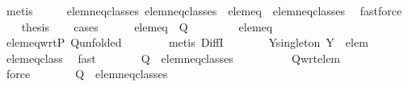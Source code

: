 \begin{isabellebody}
\ metis\isanewline
\ \ \isamarkupfalse%
\ \isamarkupfalse%
\ elem{\isacharunderscore}neq{\isacharunderscore}classes{\isacharcolon}\ {\isachardoublequoteopen}{\isacharquery}elem{\isacharunderscore}neq{\isacharunderscore}classes\ {\isacharminus}\ {\isacharbraceleft}{\isacharquery}elem{\isacharunderscore}eq{\isacharbraceright}\ {\isacharequal}\ {\isacharquery}elem{\isacharunderscore}neq{\isacharunderscore}classes{\isachardoublequoteclose}\ \isamarkupfalse%
\ fastforce\isanewline
\isanewline
\ \ \isamarkupfalse%
\ {\isacharquery}thesis\isanewline
\ \ \isamarkupfalse%
\ cases\isanewline
\ \ \ \ \isamarkupfalse%
\ {\isachardoublequoteopen}{\isacharquery}elem{\isacharunderscore}eq\ {\isasymnotin}\ {\isacharquery}Q{\isachardoublequoteclose}\ \isanewline
\ \ \ \ \isamarkupfalse%
\ \isamarkupfalse%
\ {\isachardoublequoteopen}{\isacharquery}elem{\isacharunderscore}eq\ {\isasymin}\ {\isacharbraceleft}{\isacharbraceleft}{\isacharbraceright}{\isacharbraceright}{\isachardoublequoteclose}\isanewline
\ \ \ \ \ \ \isamarkupfalse%
\ elem{\isacharunderscore}eq{\isacharunderscore}wrt{\isacharunderscore}P\ Q{\isacharunderscore}unfolded\isanewline
\ \ \ \ \ \ \isamarkupfalse%
\ {\isacharparenleft}metis\ DiffI{\isacharparenright}\isanewline
\ \ \ \ \isamarkupfalse%
\ \isamarkupfalse%
\ Y{\isacharunderscore}singleton{\isacharcolon}\ {\isachardoublequoteopen}Y\ {\isacharequal}\ {\isacharbraceleft}elem{\isacharbraceright}{\isachardoublequoteclose}\ \isamarkupfalse%
\ elem{\isacharunderscore}eq{\isacharunderscore}class\ \isamarkupfalse%
\ fast\isanewline
\ \ \ \ \isamarkupfalse%
\ \isamarkupfalse%
\ {\isachardoublequoteopen}{\isacharquery}Q\ {\isacharequal}\ {\isacharquery}elem{\isacharunderscore}neq{\isacharunderscore}classes\ {\isacharminus}\ {\isacharbraceleft}{\isacharbraceleft}{\isacharbraceright}{\isacharbraceright}{\isachardoublequoteclose}\isanewline
\ \ \ \ \ \ \isamarkupfalse%
\ Q{\isacharunderscore}wrt{\isacharunderscore}elem\isanewline
\ \ \ \ \ \ \isamarkupfalse%
\ force\isanewline
\ \ \ \ \isamarkupfalse%
\ \isamarkupfalse%
\ {\isachardoublequoteopen}{\isacharquery}Q\ {\isacharequal}\ {\isacharquery}elem{\isacharunderscore}neq{\isacharunderscore}classes{\isachardoublequoteclose}\isanewline
\ \ \ \ \ \ \isamarkupfalse%

\end{isabellebody}
